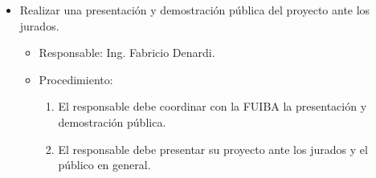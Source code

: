 \documentclass[
11pt, %
]{charter}
\begin{document}
\begin{itemize}
\begin{itemize}
	 \end{itemize}
	 
	 \item Realizar una presentación y demostración pública del proyecto ante los jurados. 
	  \begin{itemize}
	 \item Responsable: Ing. Fabricio Denardi.
	 \item Procedimiento:
	 \begin{enumerate}
	 \item El responsable debe coordinar con la FUIBA la presentación y demostración pública.
	 	\item El responsable debe presentar su proyecto ante los jurados y el público en general.
	 \end{enumerate}
	 \end{itemize}
\end{itemize}
\end{document}
